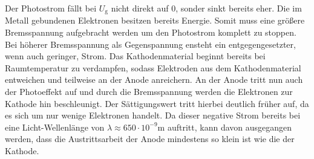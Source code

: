 \documentclass[
  bibliography=totoc,     %
  captions=tableheading,  %
  titlepage=firstiscover, %
]{scrartcl}
\begin{document}

Der Photostrom fällt bei $U_\text{g}$ nicht direkt auf 0, sonder sinkt bereits eher. Die im Metall gebundenen Elektronen besitzen bereits Energie. Somit muss eine größere Bremsspannung aufgebracht werden um den Photostrom komplett zu stoppen. \\

Bei höherer Bremsspannung als Gegenspannung ensteht ein entgegengesetzter, wenn auch geringer, Strom. 
Das Kathodenmaterial beginnt bereits bei Raumtemperatur zu verdampfen, sodass Elektroden aus dem Kathodenmaterial entweichen und teilweise an der Anode anreichern. An der Anode tritt nun auch der Photoeffekt auf und durch die Bremsspannung werden die Elektronen zur Kathode hin beschleunigt. Der Sättigungswert tritt hierbei deutlich früher auf, da es sich um nur wenige Elektronen handelt. Da dieser negative Strom bereits bei eine Licht-Wellenlänge von $\lambda \approx 650 \cdot 10^{-9} \text{m}$ auftritt, kann davon ausgegangen werden, dass die Austrittsarbeit der Anode mindestens so klein ist wie die der Kathode. 
\end{document}
